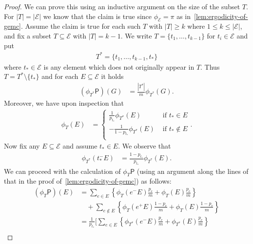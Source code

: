 \documentclass[11pt,a4paper]{article}
\begin{document}
\begin{proof}
    We can prove this using an inductive argument on the size of the subset $T$. For $|T| = |\mathcal{E}|$ we know that the claim is true since $\phi_\mathcal{E} = \pi$ as in~\cref{lem:ergodicity-of-gemc}. Assume the claim is true for each such $T$ with $|T|\geq k$ where $1\leq k \leq |\mathcal{E}|$, and fix a subset $T\subseteq \mathcal{E}$ with $|T| = k-1$. We write $T = \{t_1,\dotsc, t_{k-1}\}$ for $t_i\in\mathcal{E}$ and put
        \begin{align*}
            T^\ast = \{t_1,\dotsc, t_{k-1}, t_\ast\}
        \end{align*}
    where $t_\ast\in\mathcal{E}$ is any element which does not originally appear in $T$. Thus $T = T^\ast\setminus\{t_\ast\}$ and for each $E\subseteq\mathcal{E}$ it holds
        \begin{align}\label{eq:phi-tstar-defn}
            (\phi_{T^\ast} \mathsf{P})(G) &=\frac{|T^\ast|}{m}\phi_{T^\ast}(G).
        \end{align}
    Moreover, we have upon inspection that
        \begin{align}\label{eq:phi-tstar-prop2}
            \phi_T(E) &= \begin{cases}
                \frac{1}{p_{t_\ast}} \phi_{T^\ast}(E) &\text{ if }t_\ast\in E\\
                -\frac{1}{1-p_{t_\ast}}\phi_{T^\ast}(E) &\text{ if }t_\ast\notin E\\
            \end{cases}.
        \end{align}
    Now fix any $E\subseteq\mathcal{E}$ and assume $t_\ast\in E$. We observe that 
        \begin{align}\label{eq:phi-tstar-prop3}
            \phi_{T^\ast}(t_\ast^{-}E) &= \frac{1-p_{t_\ast}}{p_{t_\ast}}\phi_{T^\ast}(E).
        \end{align}
    We can proceed with the calculation of $\phi_{T}\mathsf{P}$ (using an argument along the lines of that in the proof of~\cref{lem:ergodicity-of-gemc}) as follows:
        \begin{align*}
            (\phi_T \mathsf{P})(E) &=\sum_{e\in E}\left\{\phi_T(e^- E)\frac{p_e}{m} + \phi_T(E)\frac{p_e}{m}\right\} \\
            &\quad+ \sum_{e\notin E} \left\{\phi_T(e^+ E)\frac{1-p_e}{m} + \phi_T(E)\frac{1-p_e}{m}\right\}\\
            &=\frac{1}{p_{t_\ast}}\biggl [\sum_{e\in E} \left\{\phi_{T^\ast}(e^- E)\frac{p_e}{m} + \phi_{T^\ast}(E)\frac{p_e}{m}\right\}  \\

\end{align*}
\end{proof}
\end{document}
